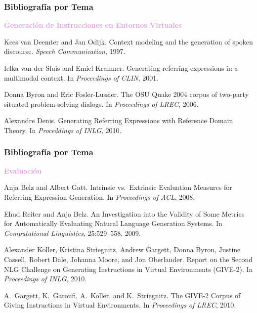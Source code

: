 \documentclass[compress,color=usenames]{beamer}
\newcommand{\mH}[1]{\textcolor{Plum}{#1}}
\begin{document}
\begin{frame}
\frametitle{Bibliograf\'ia por Tema}

\mH{\bf Generaci\'on de Instrucciones en Entornos Virtuales}
\medskip

\begin{thebibliography}{10}\small

\bibitem{} Kees van Deemter and Jan Odijk.
\newblock Context modeling and the generation of spoken discourse.
\newblock \emph{Speech Communication}, 1997.

 Ielka van der Sluis and Emiel Krahmer.
\newblock Generating referring expressions in a multimodal context.
\newblock In \emph{Proceedings of CLIN}, 2001.

 Donna Byron and Eric Fosler-Lussier.
\newblock The OSU Quake 2004 corpus of two-party situated problem-solving dialogs.
\newblock In \emph{Proceedings of LREC}, 2006.
  
 Alexandre Denis.
\newblock Generating Referring Expressions with Reference
Domain Theory.
\newblock In \emph{Proceddings of INLG}, 2010.

\end{thebibliography}
\end{frame}

\frametitle{Bibliograf\'ia por Tema}
\begin{frame}

\mH{\bf Evaluaci\'on}
\medskip

\begin{thebibliography}{10}\small

 Anja Belz and Albert Gatt.
\newblock Intrinsic vs.\ Extrinsic Evaluation Measures for Referring Expression   Generation.
\newblock In \emph{Proceedings of ACL}, 2008.

 Ehud Reiter and Anja Belz.
\newblock An Investigation into the Validity of Some
Metrics for Automatically Evaluating Natural Language Generation
Systems.
\newblock In \emph{Computational Linguistics}, 25:529--558, 2009.
  
 Alexander Koller, Kristina Striegnitz, Andrew Gargett, Donna Byron,
Justine Cassell, Robert Dale, Johanna Moore, and Jon Oberlander.
\newblock Report on the Second NLG Challenge on Generating Instructions in
Virtual Environments (GIVE-2).
\newblock In \emph{Proceedings of INLG}, 2010.

 A.\ Gargett, K.\ Garoufi, A.\ Koller, and K.\
Striegnitz.
\newblock The GIVE-2 Corpus of Giving Instructions in Virtual
Environments.
\newblock In \emph{Proceedings of LREC}, 2010.


\end{thebibliography}
\end{frame}
\end{document}
